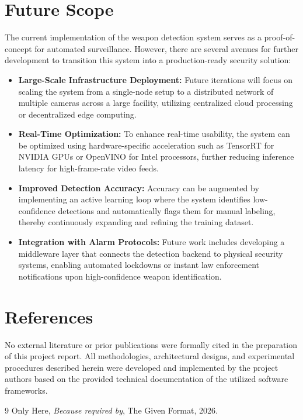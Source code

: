 \documentclass[12pt, a4paper]{report}
\begin{document}
\chapter{Future Scope}

The current implementation of the weapon detection system serves as a proof-of-concept for automated surveillance. However, there are several avenues for further development to transition this system into a production-ready security solution:

\begin{itemize}
    \item \textbf{Large-Scale Infrastructure Deployment:} Future iterations will focus on scaling the system from a single-node setup to a distributed network of multiple cameras across a large facility, utilizing centralized cloud processing or decentralized edge computing.
    \item \textbf{Real-Time Optimization:} To enhance real-time usability, the system can be optimized using hardware-specific acceleration such as TensorRT for NVIDIA GPUs or OpenVINO for Intel processors, further reducing inference latency for high-frame-rate video feeds.
    \item \textbf{Improved Detection Accuracy:} Accuracy can be augmented by implementing an active learning loop where the system identifies low-confidence detections and automatically flags them for manual labeling, thereby continuously expanding and refining the training dataset.
    \item \textbf{Integration with Alarm Protocols:} Future work includes developing a middleware layer that connects the detection backend to physical security systems, enabling automated lockdowns or instant law enforcement notifications upon high-confidence weapon identification.
\end{itemize}

\chapter*{References}

No external literature or prior publications were formally cited in the preparation of this project report. All methodologies, architectural designs, and experimental procedures described herein were developed and implemented by the project authors based on the provided technical documentation of the utilized software frameworks.
\begin{thebibliography}{9}
Only Here, \textit{Because required by}, The Given Format, 2026.
\end{thebibliography}
\end{document}
